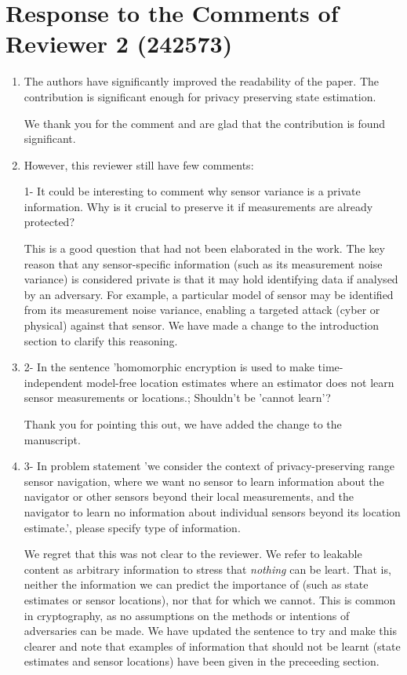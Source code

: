 \documentclass[a4paper]{scrartcl}
\newenvironment{rebuttal}{\begin{enumerate}[label={\color{grey}\thesection.\arabic{enumi}},leftmargin=0pt,ref=\thesection.\arabic{enumi}]}{\end{enumerate}}
\newcommand{\reviewtext}[1]{{\color{nblue} #1}}
\begin{document}
\section*{Response to the Comments of Reviewer 2 (242573)}
\def\thesection{R2}
\begin{rebuttal}
\item \reviewtext{The authors have significantly improved the readability of the paper. The contribution is significant enough for privacy preserving state estimation.}

We thank you for the comment and are glad that the contribution is found significant.

\item \reviewtext{However, this reviewer still have few comments:

1- It could be interesting to comment why sensor variance is a private information. Why is it crucial to preserve it if measurements are already protected?}

This is a good question that had not been elaborated in the work. The key reason that any sensor-specific information (such as its measurement noise variance) is considered private is that it may hold identifying data if analysed by an adversary. For example, a particular model of sensor may be identified from its measurement noise variance, enabling a targeted attack (cyber or physical) against that sensor. We have made a change to the introduction section to clarify this reasoning.

\item \reviewtext{2- In the sentence 'homomorphic encryption is used to make time-independent model-free location estimates where an estimator does not learn sensor measurements or locations.; Shouldn't be 'cannot learn'?}

Thank you for pointing this out, we have added the change to the manuscript.

\item \reviewtext{3- In problem statement 'we consider the context of privacy-preserving range sensor navigation, where we want no sensor to learn information about the navigator or other sensors beyond their local measurements, and the navigator to learn no information about individual sensors beyond its location estimate.', please specify type of information.}

We regret that this was not clear to the reviewer. We refer to leakable content as arbitrary information to stress that \textit{nothing} can be leart. That is, neither the information we can predict the importance of (such as state estimates or sensor locations), nor that for which we cannot. This is common in cryptography, as no assumptions on the methods or intentions of adversaries can be made. We have updated the sentence to try and make this clearer and note that examples of information that should not be learnt (state estimates and sensor locations) have been given in the preceeding section.


\end{rebuttal}
\end{document}
